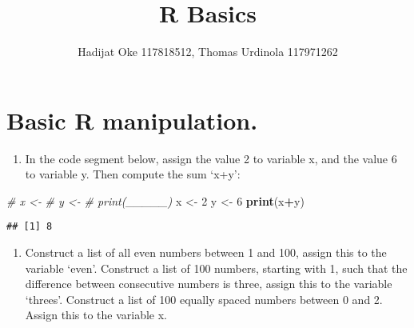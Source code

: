\documentclass[
]{article}
\title{R Basics}
\author{Hadijat Oke 117818512, Thomas Urdinola 117971262}
\date{}
\newenvironment{Shaded}{\begin{snugshade}}{\end{snugshade}}
\newcommand{\CommentTok}[1]{\textcolor[rgb]{0.56,0.35,0.01}{\textit{#1}}}
\newcommand{\DecValTok}[1]{\textcolor[rgb]{0.00,0.00,0.81}{#1}}
\newcommand{\FunctionTok}[1]{\textcolor[rgb]{0.13,0.29,0.53}{\textbf{#1}}}
\newcommand{\NormalTok}[1]{#1}
\newcommand{\OtherTok}[1]{\textcolor[rgb]{0.56,0.35,0.01}{#1}}
\newcommand{\SpecialCharTok}[1]{\textcolor[rgb]{0.81,0.36,0.00}{\textbf{#1}}}
\providecommand{\tightlist}{%
  \setlength{\itemsep}{0pt}\setlength{\parskip}{0pt}}
\begin{document}
\maketitle

{
\setcounter{tocdepth}{2}
\tableofcontents
}
\hypertarget{basic-r-manipulation.}{%
\section{Basic R manipulation.}\label{basic-r-manipulation.}}

\begin{enumerate}
\def\labelenumi{\alph{enumi}.}
\tightlist
\item
  In the code segment below, assign the value 2 to variable x, and the
  value 6 to variable y. Then compute the sum `x+y':
\end{enumerate}

\begin{Shaded}
\begin{Highlighting}[]
\CommentTok{\# x \textless{}{-} }
\CommentTok{\# y \textless{}{-} }
\CommentTok{\# print(\_\_\_\_\_)}
\NormalTok{x }\OtherTok{\textless{}{-}} \DecValTok{2}
\NormalTok{y }\OtherTok{\textless{}{-}} \DecValTok{6}
\FunctionTok{print}\NormalTok{(x}\SpecialCharTok{+}\NormalTok{y)}
\end{Highlighting}
\end{Shaded}

\begin{verbatim}
## [1] 8
\end{verbatim}

\begin{enumerate}
\def\labelenumi{\alph{enumi}.}
\setcounter{enumi}{1}
\tightlist
\item
  Construct a list of all even numbers between 1 and 100, assign this to
  the variable `even'. Construct a list of 100 numbers, starting with 1,
  such that the difference between consecutive numbers is three, assign
  this to the variable `threes'. Construct a list of 100 equally spaced
  numbers between 0 and 2. Assign this to the variable x.
\end{enumerate}
\end{document}
